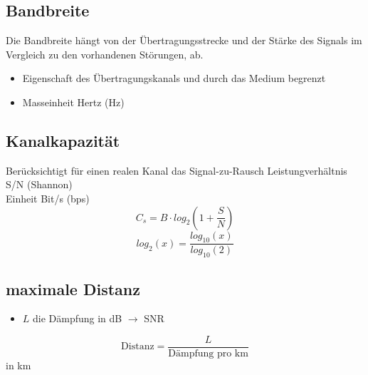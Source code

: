 \subsection{Bandbreite}{
    Die Bandbreite hängt von der Übertragungsstrecke und der Stärke des Signals im
    Vergleich zu den vorhandenen Störungen, ab.
    \begin{itemize}[noitemsep]
        \item Eigenschaft des Übertragungskanals und durch das Medium begrenzt
        \item Masseinheit Hertz (Hz)
    \end{itemize}
}


\subsection{Kanalkapazität}{
    Berücksichtigt für einen realen Kanal das Signal-zu-Rausch Leistungverhältnis S/N (Shannon)
    \\ Einheit Bit/s (bps)
    $$ C_s = B \cdot log_2(1 + \frac{S}{N})$$
    $$ log_2(x) = \frac{log_{10}(x)}{log_{10}(2)} $$
}
\subsection{maximale Distanz}{

    \begin{itemize}[noitemsep]
        \item $L$ die Dämpfung in dB $\to$ SNR
    \end{itemize}

    $$
        \text{Distanz} = \frac{L}{\text{Dämpfung pro km}}
    $$
    in km
}

